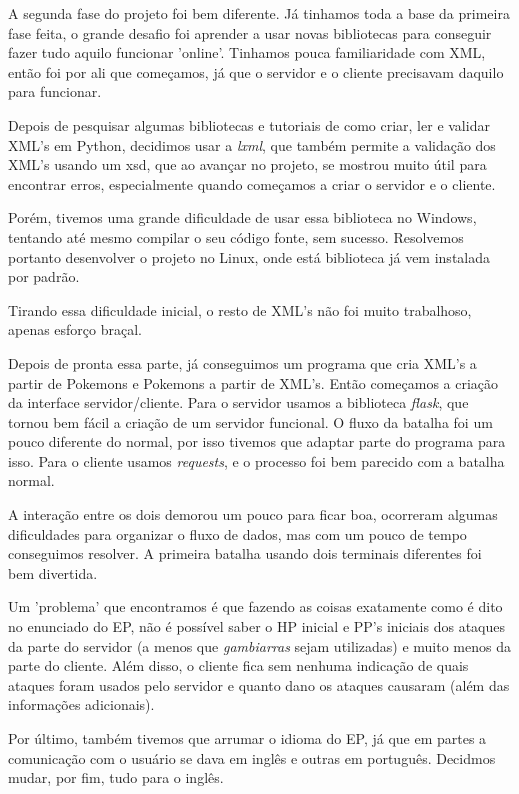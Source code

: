 \documentclass[a4paper]{article}
\begin{document}
  A segunda fase do projeto foi bem diferente. Já tinhamos toda a base da primeira fase
feita, o grande desafio foi aprender a usar novas bibliotecas para conseguir fazer tudo
aquilo funcionar 'online'. Tinhamos pouca familiaridade com XML, então foi por ali que 
começamos, já que o servidor e o cliente precisavam daquilo para funcionar.

   Depois de pesquisar algumas bibliotecas e tutoriais de como criar, ler e validar XML's
em Python, decidimos usar a \emph{lxml}, que também permite a validação dos XML's usando
um xsd, que ao avançar no projeto, se mostrou muito útil para encontrar erros, especialmente quando
começamos a criar o servidor e o cliente.

   Porém, tivemos uma grande dificuldade de usar essa biblioteca no Windows, tentando até
mesmo compilar o seu código fonte, sem sucesso. Resolvemos portanto desenvolver o projeto no
Linux, onde está biblioteca já vem instalada por padrão. 

    Tirando essa dificuldade inicial, o resto de XML's não foi muito trabalhoso, apenas
esforço braçal.

   Depois de pronta essa parte, já conseguimos um programa que cria XML's a partir de
Pokemons e Pokemons a partir de XML's. Então começamos a criação da interface servidor/cliente.
Para o servidor usamos a biblioteca \emph{flask}, que tornou bem fácil a criação de um servidor
funcional. O fluxo da batalha foi um pouco diferente do normal, por isso tivemos que adaptar
parte do programa para isso. Para o cliente usamos \emph{requests}, e o processo foi bem parecido
com a batalha normal.

   A interação entre os dois demorou um pouco para ficar boa, ocorreram algumas dificuldades
para organizar o fluxo de dados, mas com um pouco de tempo conseguimos resolver. A primeira batalha
usando dois terminais diferentes foi bem divertida.

   Um 'problema' que encontramos é que fazendo as coisas exatamente como é dito no enunciado
do EP, não é possível saber o HP inicial e PP's iniciais dos ataques da parte do servidor (a 
menos que \emph{gambiarras} sejam utilizadas) e muito menos da parte do cliente. Além disso, o
cliente fica sem nenhuma indicação de quais ataques foram usados pelo servidor e quanto dano
os ataques causaram (além das informações adicionais).

   Por último, também tivemos que arrumar o idioma do EP, já que em partes a comunicação com
o usuário se dava em inglês e outras em português. Decidmos mudar, por fim, tudo para o inglês.
\end{document}
